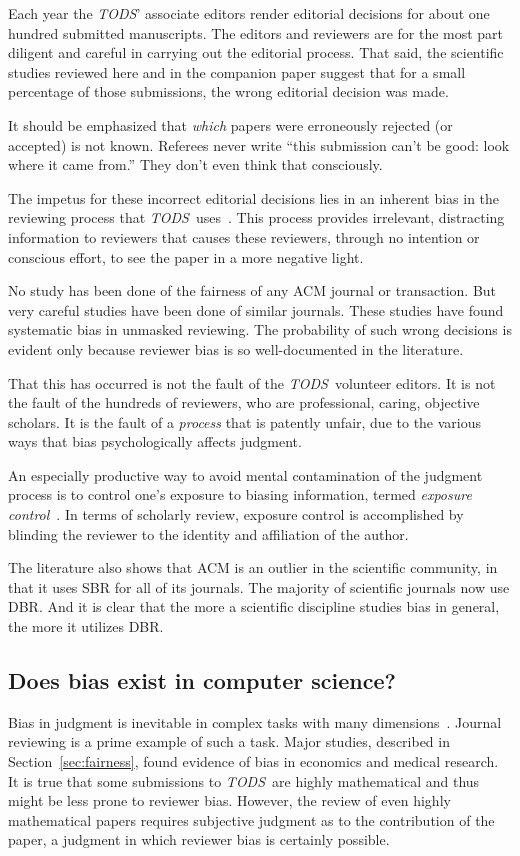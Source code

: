 \documentclass[acmtods,acmnow]{acmtrans2m}
\newcommand{\tods}{{\em TODS\/}}
\begin{document}
Each year the \tods' associate editors render editorial
decisions for about one hundred submitted manuscripts. The editors and
reviewers are for the most part diligent and careful in carrying out
the editorial process. That said, the scientific studies reviewed here and in the
companion paper suggest that for a small percentage of those submissions, the
wrong editorial decision was made.

It should be emphasized that {\em which} papers were erroneously rejected
(or accepted) is not known.  Referees never write ``this submission can't be
good: look where it came from.'' They don't even think that
consciously.

The impetus for these incorrect editorial decisions lies in an inherent bias in
the reviewing process that \tods\ uses~\cite{kardes05,wilson94}. This process provides irrelevant,
distracting information to reviewers that causes these reviewers, through no
intention or conscious effort, to see the paper in a more negative light.

No study has been done of the fairness of any ACM journal or
transaction. But very careful studies have been done of similar
journals. These studies have found systematic bias in unmasked
reviewing. The probability of such wrong decisions is evident only because
reviewer bias is so well-documented in the literature.

That this has occurred is not the fault of the \tods\ volunteer editors. It is
not the fault of the hundreds of reviewers, who are professional, caring,
objective scholars. It is the fault of a {\em process} that is patently
unfair, due to the various ways that bias psychologically affects judgment.

An especially productive way to avoid mental contamination of the judgment
process is to control one's exposure to biasing information, termed {\em
exposure control}~\cite{wilson94}. In terms of scholarly review, exposure
control is accomplished by blinding the reviewer to the identity and
affiliation of the author.

The literature also shows that ACM is an outlier in the scientific
community, in that it uses SBR for all of its journals. The majority of
scientific journals now use DBR. And
it is clear that the more a scientific discipline studies bias in general,
the more it utilizes DBR.

\subsection{Does bias exist in computer science?}
Bias in judgment is inevitable in complex tasks with many
dimensions~\cite{wilson94}. Journal reviewing is a prime example of such a
task. Major studies, described in Section~\ref{sec:fairness}, found evidence
of bias in economics and medical research. It is true that some submissions
to \tods\ are highly mathematical and thus might be less prone to reviewer
bias. However, the review of even highly mathematical papers requires subjective
judgment as to the contribution of the paper, a judgment in which reviewer
bias is certainly possible.
\end{document}

